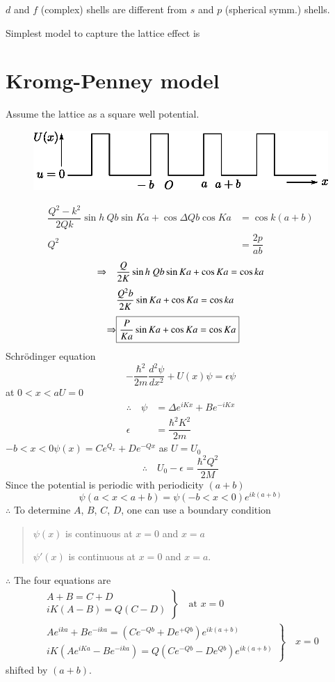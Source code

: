 $d$ and $f$ (complex) shells are different from $s$ and $p$ (spherical symm.) shells.

Simplest model to capture the lattice effect is

\section*{Kromg-Penney model}

Assume the lattice as a square well potential.
\begin{figure}[H]
\centering
\includegraphics{images/lecture21/fig2.eps}
\end{figure}
\begin{align*}
\dfrac{Q^{2}-k^{2}}{2Qk}\sin h \ Qb \sin Ka+\cos \Delta Qb \cos Ka &= \cos k(a+b)\\
Q^{2} &= \dfrac{2p}{ab}
\end{align*}
\begin{align*}
\Rightarrow\quad & \dfrac{Q}{2K}\sin h \ Qb\sin Ka+\cos Ka = \cos ka\\[3pt]
& \dfrac{Q^{2}b}{2K}\sin Ka +\cos Ka = \cos ka\\[3pt]
\Rightarrow & \fbox{$\dfrac{P}{Ka}\sin Ka+\cos Ka = \cos Ka$}
\end{align*}
Schr\"odinger equation
$$
-\dfrac{\hbar^{2}}{2m}\dfrac{d^{2}\psi}{dx^{2}}+U(x)\psi = \epsilon \psi
$$
at $0<x<a$\quad $U=0$
\begin{align*}
\therefore\quad \psi &= \Delta e^{iKx}+Be^{-iKx}\\
\epsilon &= \dfrac{\hbar^{2}K^{2}}{2m}
\end{align*}
$-b<x<0$\quad $\psi(x)=Ce^{Q_{x}}+De^{-Qx}$ as $U=U_{0}$
$$
\therefore\quad U_{0}-\epsilon = \dfrac{\hbar^{2}Q^{2}}{2M}
$$
Since the potential is periodic with periodicity $(a+b)$
$$
\psi(a<x<a+b)=\psi(-b<x<0)e^{ik(a+b)}
$$
$\therefore$ To determine $A$, $B$, $C$, $D$, one can use a boundary condition
\begin{quote}
$\psi(x)$ is continuous at $x=0$ and $x=a$

$\psi'(x)$ is continuous at $x=0$ and $x=a$.
\end{quote}
$\therefore$ The four equations are
\begin{gather*}
\left.
\begin{array}{c}
A+B=C+D\\
iK(A-B)=Q(C-D)
\end{array}
\right\} \quad \text{at } x=0\\[4pt]
\left.
\begin{array}{c}
Ae^{ika}+Be^{-ika}=(Ce^{-Qb}+De^{+Qb})e^{ik(a+b)}\\[2pt]
iK (Ae^{iKa}-Be^{-ika})=Q(Ce^{-Qb}-De^{Qb})e^{ik(a+b)}
\end{array}
\right\}\quad x=0
\end{gather*}
shifted by $(a+b)$.

